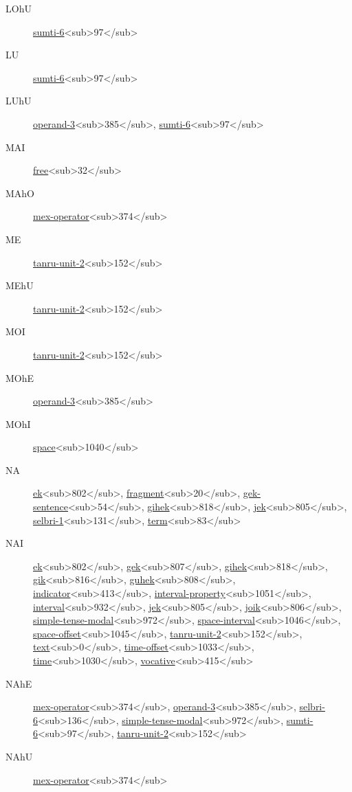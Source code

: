 \begin{description}
\item[LOhU] \hyperref[html:b97]{sumti-6}<sub>97</sub>
\item[LU] \hyperref[html:b97]{sumti-6}<sub>97</sub>
\item[LUhU] \hyperref[html:b385]{operand-3}<sub>385</sub>, \hyperref[html:b97]{sumti-6}<sub>97</sub>
\item[MAI] \hyperref[html:b32]{free}<sub>32</sub>
\item[MAhO] \hyperref[html:b374]{mex-operator}<sub>374</sub>
\item[ME] \hyperref[html:b152]{tanru-unit-2}<sub>152</sub>
\item[MEhU] \hyperref[html:b152]{tanru-unit-2}<sub>152</sub>
\item[MOI] \hyperref[html:b152]{tanru-unit-2}<sub>152</sub>
\item[MOhE] \hyperref[html:b385]{operand-3}<sub>385</sub>
\item[MOhI] \hyperref[html:b1040]{space}<sub>1040</sub>
\item[NA] \hyperref[html:b802]{ek}<sub>802</sub>, \hyperref[html:b20]{fragment}<sub>20</sub>, \hyperref[html:b54]{gek-sentence}<sub>54</sub>, \hyperref[html:b818]{gihek}<sub>818</sub>, \hyperref[html:b805]{jek}<sub>805</sub>, \hyperref[html:b131]{selbri-1}<sub>131</sub>, \hyperref[html:b83]{term}<sub>83</sub>
\item[NAI] \hyperref[html:b802]{ek}<sub>802</sub>, \hyperref[html:b807]{gek}<sub>807</sub>, \hyperref[html:b818]{gihek}<sub>818</sub>, \hyperref[html:b816]{gik}<sub>816</sub>, \hyperref[html:b808]{guhek}<sub>808</sub>, \hyperref[html:b413]{indicator}<sub>413</sub>, \hyperref[html:b1051]{interval-property}<sub>1051</sub>, \hyperref[html:b932]{interval}<sub>932</sub>, \hyperref[html:b805]{jek}<sub>805</sub>, \hyperref[html:b806]{joik}<sub>806</sub>, \hyperref[html:b972]{simple-tense-modal}<sub>972</sub>, \hyperref[html:b1046]{space-interval}<sub>1046</sub>, \hyperref[html:b1045]{space-offset}<sub>1045</sub>, \hyperref[html:b152]{tanru-unit-2}<sub>152</sub>, \hyperref[html:b0]{text}<sub>0</sub>, \hyperref[html:b1033]{time-offset}<sub>1033</sub>, \hyperref[html:b1030]{time}<sub>1030</sub>, \hyperref[html:b415]{vocative}<sub>415</sub>
\item[NAhE] \hyperref[html:b374]{mex-operator}<sub>374</sub>, \hyperref[html:b385]{operand-3}<sub>385</sub>, \hyperref[html:b136]{selbri-6}<sub>136</sub>, \hyperref[html:b972]{simple-tense-modal}<sub>972</sub>, \hyperref[html:b97]{sumti-6}<sub>97</sub>, \hyperref[html:b152]{tanru-unit-2}<sub>152</sub>
\item[NAhU] \hyperref[html:b374]{mex-operator}<sub>374</sub>

\end{description}
